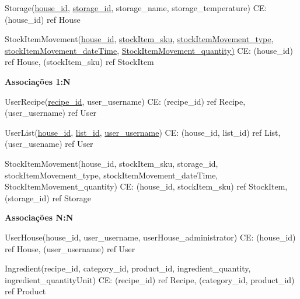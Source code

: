 {\begin{description}
		\item Storage(\underline{house\_id}, \underline{storage\_id}, storage\_name, storage\_temperature)  \newline
		CE: {(house\_id) ref House}
		
		\item 	StockItemMovement(\underline{house\_id}, \underline{stockItem\_sku}, \underline{stockItemMovement\_type}, \newline \underline{stockItemMovement\_dateTime}, \underline{StockItemMovement\_quantity)}  \newline
		CE: {(house\_id) ref House, (stockItem\_sku) ref StockItem}
		
		
	\end{description}
	
	\textbf{Associações 1:N}
	
	\begin{description}
		\item UserRecipe(\underline{recipe\_id}, user\_username) \newline
		CE: {(recipe\_id) ref Recipe, (user\_username) ref User}
		
		\item UserList(\underline{house\_id}, \underline{list\_id}, \underline{user\_username}) \newline
		CE: {(house\_id, list\_id) ref List, (user\_usename) ref User}
		
		
		
		\item StockItemMovement(house\_id, stockItem\_sku, storage\_id, stockItemMovement\_type, \newline stockItemMovement\_dateTime, StockItemMovement\_quantity) \newline
		CE: {(house\_id, stockItem\_sku) ref StockItem, (storage\_id) ref Storage}
	\end{description}
	
	\textbf{Associações N:N}
	
	\begin{description}
		\item UserHouse(house\_id, user\_username, userHouse\_administrator) \newline
		CE: {(house\_id) ref House, (user\_username) ref User}
		
		\item Ingredient(recipe\_id, category\_id, product\_id, ingredient\_quantity, ingredient\_quantityUnit) \newline
		CE: {(recipe\_id) ref Recipe, (category\_id, product\_id) ref Product}
		

\end{description}}
